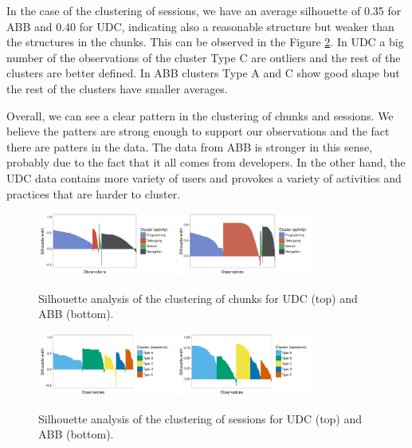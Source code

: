 \documentclass[conference]{IEEEtran}
\begin{document}
In the case of the clustering of sessions, we have an average silhouette of 0.35 for ABB and 0.40 for UDC, indicating also a reasonable structure but weaker than the structures in the chunks. This can be observed in the Figure \ref{silhouette_sessions}. In UDC a big number of the observations of the cluster Type C are outliers and the rest of the clusters are better defined. In ABB clusters Type A and C show good shape but the rest of the clusters have smaller averages.

Overall, we can see a clear pattern in the clustering of chunks and sessions. We believe the patters are strong enough to support our observations and the fact there are patters in the data. The data from ABB is stronger in this sense, probably due to the fact that it all comes from developers. In the other hand, the UDC data contains more variety of users and provokes a variety of activities and practices that are harder to cluster. 



\begin{figure}[!ht]
\centering		
\includegraphics[width=0.4\textwidth]{Figures/UDC_silhouette_chunks}
\includegraphics[width=0.4\textwidth]{Figures/ABB_silhouette_chunks}	
\caption{Silhouette analysis of the clustering of chunks for UDC (top) and ABB (bottom).}
\label{silhouette_chunks}
\end{figure}
	
	
\begin{figure}[!ht]
\centering		
\includegraphics[width=0.4\textwidth]{Figures/UDC_silhouette_sessions}
\includegraphics[width=0.4\textwidth]{Figures/ABB_silhouette_sessions}	
\caption{Silhouette analysis of the clustering of sessions for UDC (top) and ABB (bottom).}
\label{silhouette_sessions}
\end{figure}
\end{document}
